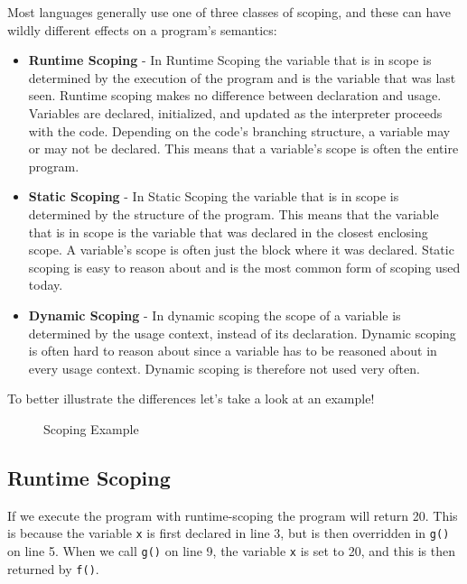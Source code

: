 Most languages generally use one of three classes of scoping, and these can have wildly different effects on a program's semantics:

\begin{itemize}
    \item \textbf{Runtime Scoping} - In Runtime Scoping the variable that is in scope is determined by the execution of the program and is the variable that was last seen.
                                    Runtime scoping makes no difference between declaration and usage.                           
                                    Variables are declared, initialized, and updated as the interpreter proceeds with the code. 
                                    Depending on the code's branching structure, a variable may or may not be declared.
                                    This means that a variable's scope is often the entire program.
                                    
    \item \textbf{Static Scoping} - In Static Scoping the variable that is in scope is determined by the structure of the program. 
                                    This means that the variable that is in scope is the variable that was declared in the closest enclosing scope.
                                    A variable's scope is often just the block where it was declared.
                                    Static scoping is easy to reason about and is the most common form of scoping used today.
    \item \textbf{Dynamic Scoping} - In dynamic scoping the scope of a variable is determined by the usage context, instead of its declaration.
                                    Dynamic scoping is often hard to reason about since a variable has to be reasoned about in every usage context.
                                    Dynamic scoping is therefore not used very often.                      
\end{itemize}

To better illustrate the differences let's take a look at an example!

\begin{figure}[!h]
    \centering
      
    \caption{Scoping Example}
    \label{fig:scoping}
\end{figure}

\subsection*{Runtime Scoping}
If we execute the program with runtime-scoping the program will return 20. 
This is because the variable \texttt{x} is first declared in line 3, but is then overridden in \texttt{g()} on line 5.
When we call \texttt{g()} on line 9, the variable \texttt{x} is set to 20, and this is then returned by \texttt{f()}.

